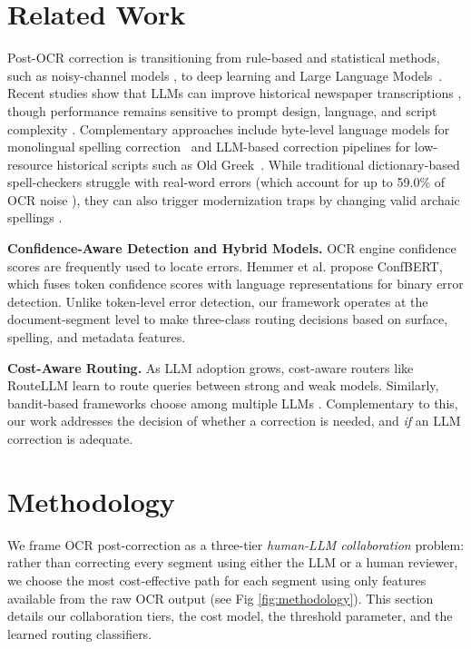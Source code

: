 \documentclass[sigconf]{acmart}
\begin{document}
\section{Related Work}
Post-OCR correction is transitioning from rule-based and statistical methods, such as noisy-channel models \cite{kissos_ocr_2016}, to deep learning and Large Language Models~\cite{nguyen2021survey}. Recent studies show that LLMs can improve historical newspaper transcriptions \cite{thomas2024leveraging}, though performance remains sensitive to prompt design, language, and script complexity \cite{boros2024post, sohail2024decipheringunderservedbenchmarkingllm}. Complementary approaches include byte-level language models for monolingual spelling correction~\cite{araujo2025postocr} and LLM-based correction pipelines for low-resource historical scripts such as Old Greek~\cite{evangelatos2025oldgreek}. While traditional dictionary-based spell-checkers struggle with real-word errors (which account for up to 59.0\% of OCR noise \cite{10.1007/978-3-031-70442-0_13}), they can also trigger modernization traps by changing valid archaic spellings \cite{hammarstrom2025investigation}.

\medskip\noindent\textbf{Confidence-Aware Detection and Hybrid Models.}
OCR engine confidence scores are frequently used to locate errors. Hemmer et al. \cite{10.1007/978-3-031-70442-0_13} propose ConfBERT, which fuses token confidence scores with language representations for binary error detection. Unlike token-level error detection, our framework operates at the document-segment level to make three-class routing decisions based on surface, spelling, and metadata features.

\medskip\noindent\textbf{Cost-Aware Routing.}
As LLM adoption grows, cost-aware routers like RouteLLM \cite{Ong2025RouteLLMLT, li2025costaware} learn to route queries between strong and weak models. Similarly, bandit-based frameworks choose among multiple LLMs \cite{panda2025pilot, wang2025barp}. Complementary to this, our work addresses the decision of whether a correction is needed, and \textit{if} an LLM correction is adequate.




\section{Methodology}

We frame OCR post-correction as a three-tier \emph{human-LLM collaboration} problem: rather than correcting every segment using either the LLM or a human reviewer, we choose the most cost-effective path for each segment using only features available from the raw OCR output (see Fig \ref{fig:methodology}). This section details our collaboration tiers, the cost model, the threshold parameter, and the learned routing classifiers.
\end{document}
